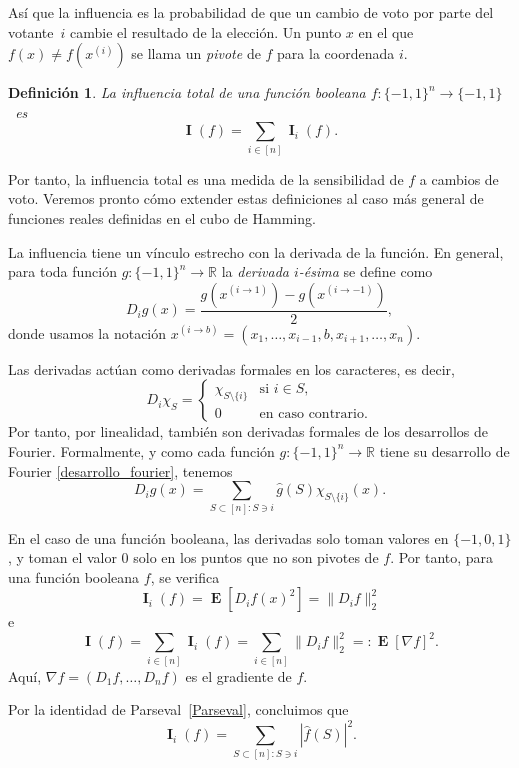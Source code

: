 \documentclass[autocontact]{gaceta}
\newcommand{\R}{\mathbb{R}}
\newtheorem{definition}{Definición}
\DeclareMathOperator{\II}{\mathbf{I}}
\DeclareMathOperator{\EE}{\mathbf{E}}
\begin{document}
Así que la influencia es la probabilidad de que un cambio de voto por parte del votante~$i$ cambie el resultado de la elección. Un punto $x$ en el que $f(x)\neq f(x^{(i)})$ se llama un \emph{pivote} de $f$ para la coordenada $i$.

\begin{definition} La influencia total de una función booleana $f:\{-1,1\}^n\to \{-1,1\}$~es
\[
\II(f)= \sum_{i\in [n] } \II_i(f).
\]
\end{definition}

Por tanto, la influencia total es una medida de la sensibilidad de $f$ a cambios de voto.
Veremos pronto cómo extender estas definiciones al caso más general de funciones reales definidas en el cubo de Hamming.

La influencia tiene un vínculo estrecho con la derivada de la función. En general, para toda función $g:\{-1,1\}^n\to \R$ la \emph{derivada $i$-ésima} se define como
\[
   D_ig({x}) = \frac{g({x}^{(i\to1)}) - g({ x}^{(i\to-1)})}{2},
\]
donde usamos la notación ${x}^{(i\to b)}=(x_1,\dots,x_{i-1},b,x_{i+1},\dots, x_n)$.

Las derivadas actúan como derivadas formales en los caracteres, es decir,
\[
   D_i\chi_S = \begin{cases}
   \chi_{S\setminus\{i\}} &\text{si } i\in S,
   \\
   0 &\text{en caso contrario.}
   \end{cases}
\]
Por tanto, por linealidad, también son derivadas formales de los desarrollos de Fourier. Formalmente, y como cada función $g:\{-1,1\}^n\to \R$ tiene su desarrollo de Fourier \eqref{desarrollo_fourier}, tenemos
\begin{equation}\label{eqn:derivativeFourier}
   D_ig(x)=\sum_{S\subset [n] \colon S\ni i}\widehat{g}(S) \chi_{S\setminus \{i\}}(x).
\end{equation}

En el caso de una función booleana, las derivadas solo toman valores en $\{-1,0,1\}$, y toman el valor $0$ solo en los puntos que no son pivotes de $f$. Por tanto, para una función booleana $f$, se verifica
\begin{equation}
\label{eqn:influencia-derivada}
   \II_i(f) = \EE[D_if(x)^2] = \|D_i f\|_2^2
\end{equation}
e
\[
   \II(f) = \sum_{i\in [n]} \II_i(f)
   = \sum_{i\in [n]} \|D_i f\|_2^2 =: \EE[\nabla f]^2.
\]
Aquí, $\nabla f=(D_1f,\dots,D_nf)$ es el gradiente de $f$.

Por la identidad de Parseval~\eqref{Parseval}, concluimos que
\begin{equation}\label{eq:influencia_i}
\II_i(f)= \sum_{S\subset [n] \colon S\ni i}|\widehat{f}(S)|^2.
\end{equation}
\end{document}

